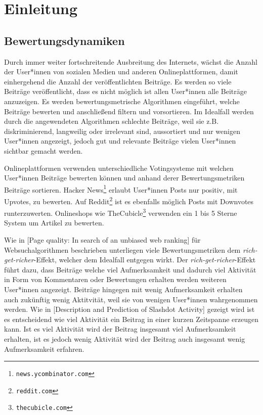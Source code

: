\chapter{Einleitung}


\section{Bewertungsdynamiken}
Durch immer weiter fortschreitende Ausbreitung des Internets, wächst die Anzahl der User*innen von sozialen Medien und anderen Onlineplattformen, damit einhergehend die Anzahl der veröffentlichten Beiträge. Es werden so viele Beiträge veröffentlicht, dass es nicht möglich ist allen User*innen alle Beiträge anzuzeigen. Es werden bewertungsmetrische Algorithmen eingeführt, welche Beiträge bewerten und anschließend filtern und vorsortieren. Im Idealfall werden durch die angewendeten Algorithmen schlechte Beiträge, weil sie z.B. diskriminierend, langweilig oder irrelevant sind, aussortiert und nur wenigen User*innen angezeigt, jedoch gut und relevante Beiträge vielen User*innen sichtbar gemacht werden. 

Onlineplattformen verwenden unterschiedliche Votingsysteme mit welchen User*innen Beiträge bewerten können und anhand derer Bewertungsmetriken Beiträge sortieren. Hacker News\footnote{\texttt{news.ycombinator.com}} erlaubt User*innen Posts nur positiv, mit Upvotes, zu bewerten. Auf Reddit\footnote{\texttt{reddit.com}} ist es ebenfalls möglich Posts mit Downvotes runterzuwerten. Onlineshops wie TheCubicle\footnote{\texttt{thecubicle.com}} verwenden ein 1 bis 5 Sterne System um Artikel zu bewerten. 

Wie in [Page quality: In search of an unbiased web ranking] für Websuchalgorithmen beschrieben unterliegen viele Bewertungsmetriken dem \textit{rich-get-richer}-Effekt, welcher dem Idealfall entgegen wirkt. Der \textit{rich-get-richer}-Effekt führt dazu, dass Beiträge welche viel Aufmerksamkeit und dadurch viel Aktivität in Form von Kommentaren oder Bewertungen erhalten werden weiteren User*innen angezeigt. Beiträge hingegen mit wenig Aufmerksamkeit erhalten auch zukünftig wenig Aktitvität, weil sie von wenigen User*innen wahrgenommen werden. Wie in [Description and Prediction of Slashdot Activity] gezeigt wird ist es entscheidend wie viel Aktivität ein Beitrag in einer kurzen Zeitspanne erzeugen kann. Ist es viel Aktivität wird der Beitrag insgesamt viel Aufmerksamkeit erhalten, ist es jedoch wenig Aktivität wird der Beitrag auch insgesamt wenig Aufmerksamkeit erfahren.

